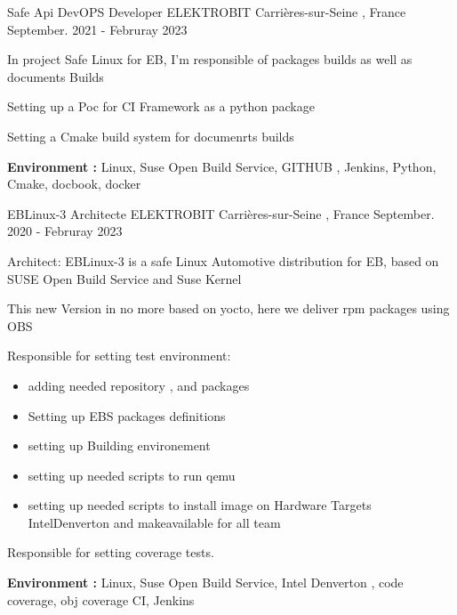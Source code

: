 \documentclass[11pt, a4paper]{awesome-cv} %
\begin{document}
\begin{cventries}
 \cventry
    {Safe Api DevOPS Developer} %
    {ELEKTROBIT} %
    {Carrières-sur-Seine , France} %
    {September. 2021 - Februray 2023} %
    { %
        \begin{cvitems}
            \item {In project Safe Linux for EB, I'm responsible of packages builds as well as documents Builds}
            \item {Setting up a Poc for CI Framework as a python package}
            \item {Setting a Cmake build system for documenrts builds}                        
            \item { \textbf{Environment :} Linux, Suse Open Build Service, GITHUB , Jenkins, Python, Cmake, docbook, docker}
        \end{cvitems}
    }


    \cventry
    {EBLinux-3 Architecte} %
    {ELEKTROBIT} %
    {Carrières-sur-Seine , France} %
    {September. 2020 - Februray 2023} %
    { %
        \begin{cvitems}
            \item {Architect: EBLinux-3 is a safe Linux Automotive distribution for EB, based on SUSE Open Build Service and Suse Kernel}
            \item {This new Version in no more based on yocto, here we deliver rpm packages using OBS}
            \item {Responsible for setting test environment:}
            \begin{itemize}
                \item adding needed repository , and packages 
                \item Setting up EBS packages definitions   
                \item setting up Building environement 
                \item setting up needed scripts to run qemu 
                \item setting up needed scripts to install image  on Hardware Targets IntelDenverton and makeavailable for all team
              \end{itemize}
            \item {Responsible for setting coverage tests.}
            \item { \textbf{Environment :} Linux, Suse Open Build Service, Intel Denverton , code coverage, obj coverage CI, Jenkins}
        \end{cvitems}
    }


\end{cventries}
\end{document}

